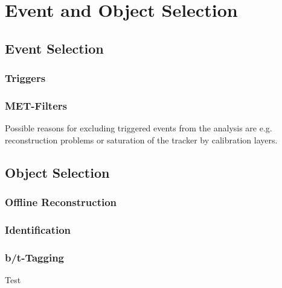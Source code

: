 
\chapter{Event and Object Selection}

\section{Event Selection}
\subsection{Triggers}
\subsection{MET-Filters}
Possible reasons for excluding triggered events from the analysis are e.g. reconstruction problems or saturation of the tracker by calibration layers.


\section{Object Selection}
\subsection{Offline Reconstruction}
\subsection{Identification}
\subsection{b/t-Tagging}
\label{sec:b_tagging}

Test\cite{CMS:CMS-PAS-BTV-15-001}